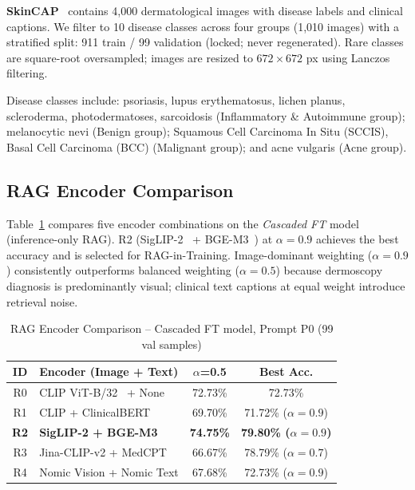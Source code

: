 \documentclass[conference,a4paper]{IEEEtran}
\begin{document}
\textbf{SkinCAP}~\cite{mendez2022} contains 4,000 dermatological images
with disease labels and clinical captions.  We filter to 10 disease
classes across four groups (1,010 images) with a stratified split:
911 train / 99 validation (locked; never regenerated).  Rare classes
are square-root oversampled; images are resized to $672{\times}672$ px
using Lanczos filtering.

Disease classes include: psoriasis, lupus erythematosus,
lichen planus, scleroderma, photodermatoses, sarcoidosis
(Inflammatory \& Autoimmune group); melanocytic nevi (Benign group);
Squamous Cell Carcinoma In Situ (SCCIS), Basal Cell Carcinoma (BCC)
(Malignant group); and acne vulgaris (Acne group).

\subsection{RAG Encoder Comparison}

Table~\ref{tab:encoders} compares five encoder combinations on the
\textit{Cascaded FT} model (inference-only RAG).
R2 (SigLIP-2~\cite{zhai2023} + BGE-M3~\cite{chen2024bge}) at
$\alpha{=}0.9$ achieves the best accuracy and is selected for
RAG-in-Training.  Image-dominant weighting ($\alpha{=}0.9$)
consistently outperforms balanced weighting ($\alpha{=}0.5$) because
dermoscopy diagnosis is predominantly visual; clinical text captions
at equal weight introduce retrieval noise.

\begin{table}[!ht]
\caption{RAG Encoder Comparison -- Cascaded FT model, Prompt P0
         (99 val samples)}
\label{tab:encoders}
\begin{center}
\setlength{\tabcolsep}{4pt}
\begin{tabular}{clcc}
\toprule
\textbf{ID} & \textbf{Encoder (Image + Text)} & \textbf{$\alpha$=0.5} & \textbf{Best Acc.} \\
\midrule
R0 & CLIP ViT-B/32~\cite{radford2021} + None & 72.73\%  & 72.73\% \\
R1 & CLIP + ClinicalBERT          & 69.70\%  & 71.72\% ($\alpha{=}0.9$) \\
\textbf{R2} & \textbf{SigLIP-2 + BGE-M3} & \textbf{74.75\%} & \textbf{79.80\% ($\alpha{=}0.9$)} \\
R3 & Jina-CLIP-v2 + MedCPT       & 66.67\%  & 78.79\% ($\alpha{=}0.7$) \\
R4 & Nomic Vision + Nomic Text   & 67.68\%  & 72.73\% ($\alpha{=}0.9$) \\
\bottomrule
\end{tabular}
\end{center}
\end{table}
\end{document}
